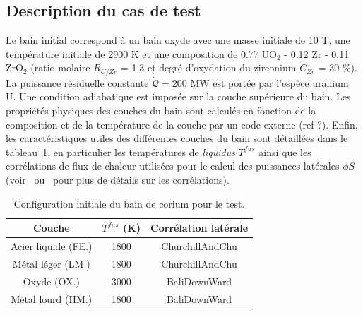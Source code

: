 \subsection{Description du cas de test}
Le bain initial correspond à un bain oxyde avec une masse initiale de 10 T, une température initiale de 2900 K et une composition de 0.77 UO$_2$ - 0.12 Zr - 0.11 ZrO$_2$ (ratio molaire $R_{U/Zr}$ = 1.3 et degré d'oxydation du zirconium $C_{Zr}$ = 30 \%). La puissance résiduelle constante $\dot{\mathcal{Q}} = 200$ MW est portée par l'espèce uranium U. Une condition adiabatique est imposée sur la couche supérieure du bain. Les propriétés physiques des couches du bain sont calculés en fonction de la composition et de la température de la couche par un code externe (ref ?). Enfin, les caractéristiques utiles des différentes couches du bain sont détaillées dans le tableau~\ref{tab:caracteristiques_couches_bain}, en particulier les températures de \textit{liquidus} $T^{fus}$ ainsi que les corrélations de flux de chaleur utilisées pour le calcul des puissances latérales $\phi S$ (voir~\cite{Bonnet1999} ou~\cite{Tourniaire2009a} pour plus de détails sur les corrélations).
\begin{table}
	\centering
	\begin{tabular}{ccc} 
	\hline
	Couche & $T^{fus}$ (K) & Corrélation latérale\\
	\hline
	Acier liquide (FE.) & 1800 & ChurchillAndChu\\
	Métal léger (LM.) & 1800 & ChurchillAndChu\\
	Oxyde (OX.) & 3000 & BaliDownWard\\
	Métal lourd (HM.) & 1800 & BaliDownWard\\
	\hline
	\end{tabular}	
	\caption{Configuration initiale du bain de corium pour le test.} 
	\label{tab:caracteristiques_couches_bain}
\end{table}

